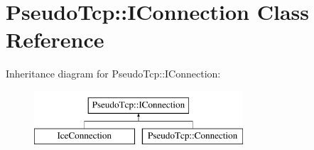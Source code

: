 \hypertarget{classPseudoTcp_1_1IConnection}{
\section{PseudoTcp::IConnection Class Reference}
\label{classPseudoTcp_1_1IConnection}
}
Inheritance diagram for PseudoTcp::IConnection:\begin{figure}[H]
\begin{center}
\leavevmode
\includegraphics[height=2cm]{classPseudoTcp_1_1IConnection}
\end{center}
\end{figure}
